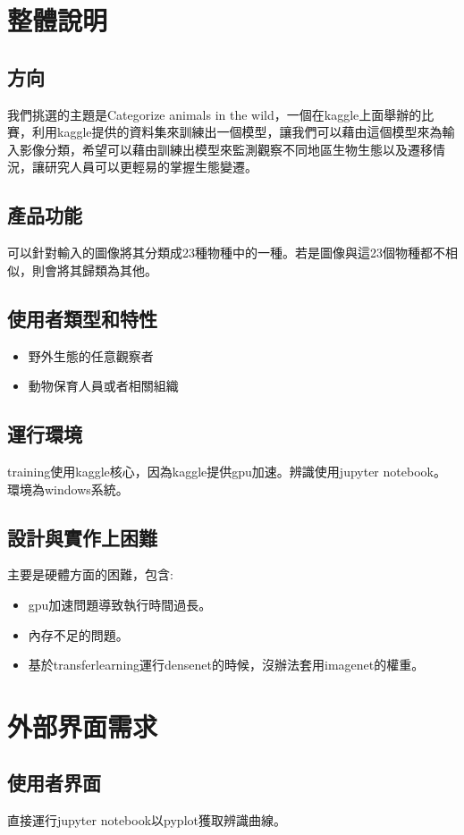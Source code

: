 \documentclass{scrreprt}
\begin{document}
\chapter{整體說明}
\section{方向}
我們挑選的主題是Categorize animals in the wild，一個在kaggle上面舉辦的比賽，利用kaggle提供的資料集來訓練出一個模型，讓我們可以藉由這個模型來為輸入影像分類，希望可以藉由訓練出模型來監測觀察不同地區生物生態以及遷移情況，讓研究人員可以更輕易的掌握生態變遷。

\section{產品功能}
可以針對輸入的圖像將其分類成23種物種中的一種。若是圖像與這23個物種都不相似，則會將其歸類為其他。

\section{使用者類型和特性}
\begin{itemize}
\item 野外生態的任意觀察者
\item 動物保育人員或者相關組織
\end{itemize}

\section{運行環境}
training使用kaggle核心，因為kaggle提供gpu加速。辨識使用jupyter notebook。環境為windows系統。

\section{設計與實作上困難}
主要是硬體方面的困難，包含:
\begin{itemize}
	\item gpu加速問題導致執行時間過長。
	\item 內存不足的問題。
	\item 基於transferlearning運行densenet的時候，沒辦法套用imagenet的權重。
\end{itemize}


\chapter{外部界面需求}
\section{使用者界面}
直接運行jupyter notebook以pyplot獲取辨識曲線。
\end{document}

